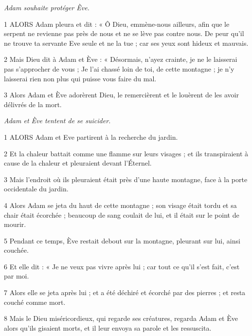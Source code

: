 \par \textit{Adam souhaite protéger Ève.}

\par 1 ALORS Adam pleura et dit : « Ô Dieu, emmène-nous ailleurs, afin que le serpent ne revienne pas près de nous et ne se lève pas contre nous. De peur qu'il ne trouve ta servante Eve seule et ne la tue ; car ses yeux sont hideux et mauvais.

\par 2 Mais Dieu dit à Adam et Ève : « Désormais, n'ayez crainte, je ne le laisserai pas s'approcher de vous ; Je l'ai chassé loin de toi, de cette montagne ; je n’y laisserai rien non plus qui puisse vous faire du mal.

\par 3 Alors Adam et Ève adorèrent Dieu, le remercièrent et le louèrent de les avoir délivrés de la mort.


\par \textit{Adam et Ève tentent de se suicider.}

\par 1 ALORS Adam et Eve partirent à la recherche du jardin.

\par 2 Et la chaleur battait comme une flamme sur leurs visages ; et ils transpiraient à cause de la chaleur et pleuraient devant l'Éternel.

\par 3 Mais l'endroit où ils pleuraient était près d'une haute montagne, face à la porte occidentale du jardin.

\par 4 Alors Adam se jeta du haut de cette montagne ; son visage était tordu et sa chair était écorchée ; beaucoup de sang coulait de lui, et il était sur le point de mourir.

\par 5 Pendant ce temps, Ève restait debout sur la montagne, pleurant sur lui, ainsi couchée.

\par 6 Et elle dit : « Je ne veux pas vivre après lui ; car tout ce qu’il s’est fait, c’est par moi.

\par 7 Alors elle se jeta après lui ; et a été déchiré et écorché par des pierres ; et resta couché comme mort.

\par 8 Mais le Dieu miséricordieux, qui regarde ses créatures, regarda Adam et Ève alors qu'ils gisaient morts, et il leur envoya sa parole et les ressuscita.

